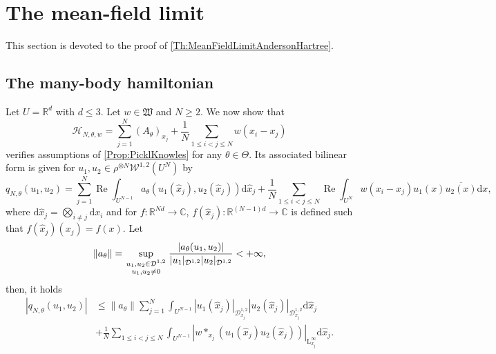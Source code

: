 \documentclass{article}
\def\W{\mathcal W}
\def\R{\mathbb R}
\def\C{\mathbb C}
\def\L{\mathrm L}
\DeclareMathOperator{\re}{Re}
\def\d{\mathrm{d}}
\newcommand{\Atop}[2]{\genfrac{}{}{0pt}{1}{#1}{#2}}
\theoremstyle{definition}
\numberwithin{equation}{section}
\begin{document}
\section{The mean-field limit}

This section is devoted to the proof of \cref{Th:MeanFieldLimitAndersonHartree}.


\subsection{The many-body hamiltonian}

Let $U=\R^d$ with $d\leqslant 3$. Let $w\in\mathfrak{W}$ and $N\geqslant 2$. We now show that $$\mathcal{H}_{N,\theta,w}=\sum_{j=1}^N (A_\theta)_{x_j} + \frac{1}{N}\sum_{1\leqslant i<j\leqslant N}w(x_i-x_j)$$ verifies assumptions of \cref{Prop:PicklKnowles} for any $\theta\in\Theta$. Its associated bilinear form is given for $u_1,u_2\in\rho^{\otimes N}\W^{1,2}(U^N)$ by
\begin{equation}
    q_{N,\theta}(u_1,u_2) = \sum_{j=1}^N \re\int_{U^{N-1}} a_\theta(u_1(\hat{x}_j),u_2(\hat{x}_j))\d\hat{x}_j+ \frac{1}{N}\sum_{1\leqslant i<j\leqslant N}\re\int_{U^N}w(x_i-x_j)u_1(x)\overline{u_2(x)}\d x,
\end{equation}
where $\d\hat{x}_j = \bigotimes_{i\neq j}\d x_i$ and for $f:\R^{Nd}\to\C$, $f(\hat{x}_j):\R^{(N-1)d}\to\C$ is defined such that $f(\hat{x}_j)(x_j)=f(x)$. Let $$\|a_\theta\| = \sup_{\Atop{u_1,u_2\in\mathcal{D}^{1,2}}{u_1,u_2\neq 0}}\frac{|a_\theta(u_1,u_2)|}{|u_1|_{\mathcal{D}^{1,2}}|u_2|_{\mathcal{D}^{1,2}}}<+\infty,$$
then, it holds
\begin{align*}
    |q_{N,\theta}(u_1,u_2)| &\leqslant \|a_\theta\|\sum_{j=1}^N \int_{U^{N-1}} |u_1(\hat{x}_j)|_{\mathcal{D}^{1,2}_{x_j}}|u_2(\hat{x}_j)|_{\mathcal{D}^{1,2}_{x_j}}\d\hat{x}_j \\
    &+ \frac{1}{N}\sum_{1\leqslant i<j\leqslant N}\int_{U^{N-1}}|w*_{x_j}(u_1(\hat{x}_j)u_2(\hat{x}_j))|_{\L^\infty_{x_j}} \d\hat{x}_j.
\end{align*}
\end{document}
